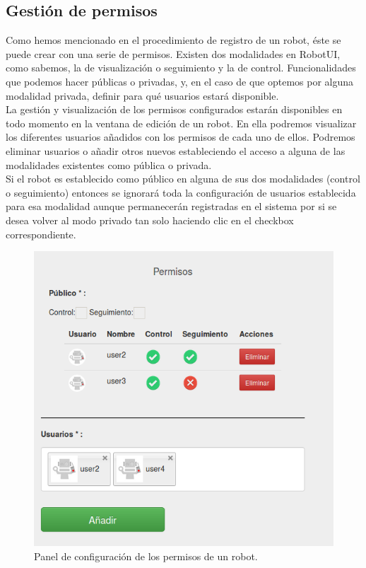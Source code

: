 \subsection{Gestión de permisos}

Como hemos mencionado en el procedimiento de registro de un robot, éste se puede crear con una serie de permisos. Existen dos modalidades en RobotUI, como sabemos, la de visualización o seguimiento
y la de control. Funcionalidades que podemos hacer públicas o privadas, y, en el caso de que optemos por alguna modalidad privada, definir para qué usuarios estará disponible.\\

La gestión y visualización de los permisos configurados estarán disponibles en todo momento en la ventana de edición de un robot. En ella podremos visualizar los diferentes usuarios añadidos con
los permisos de cada uno de ellos. Podremos eliminar usuarios o añadir otros nuevos estableciendo el acceso a alguna de las modalidades existentes como pública o privada.\\

Si el robot es establecido como público en alguna de sus dos modalidades (control o seguimiento) entonces se ignorará toda la configuración de usuarios establecida para esa modalidad aunque
permanecerán registradas en el sistema por si se desea volver al modo privado tan solo haciendo clic en el checkbox correspondiente.\\

\begin{figure}[H]
  \begin{center}
    \includegraphics[scale=0.5]{imagenes/manual-usuario/panel-permisos.png}
  \end{center}
  \caption{Panel de configuración de los permisos de un robot.}
  \label{website:creacion-robot}
\end{figure}


